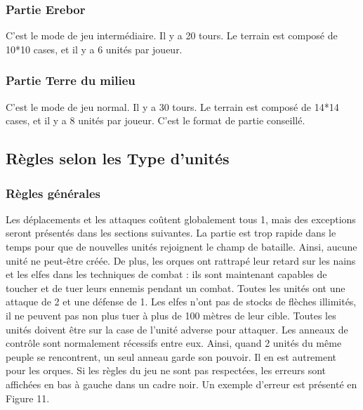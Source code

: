 \subsubsection{Partie Erebor}
C'est le mode de jeu intermédiaire. Il y a 20 tours. Le terrain est composé de 10*10 cases, et il y a 6 unités par joueur.
\subsubsection{Partie Terre du milieu}
C'est le mode de jeu normal. Il y a 30 tours. Le terrain est composé de 14*14 cases, et il y a 8 unités par joueur. C'est le format de partie conseillé.

\subsection{Règles selon les Type d'unités}
\subsubsection{Règles générales}
Les déplacements et les attaques coûtent globalement tous 1, mais des exceptions seront présentés dans les sections suivantes.
\newline
\newline
La partie est trop rapide dans le temps pour que de nouvelles unités rejoignent le champ de bataille. Ainsi, aucune unité ne peut-être créée.
\newline
 De plus, les orques ont rattrapé leur retard sur les nains et les elfes dans les techniques de combat : ils sont maintenant capables de toucher et de tuer leurs ennemis pendant un combat.
\newline
\newline
Toutes les unités ont une attaque de 2 et une défense de 1.
\newline
Les elfes n'ont pas de stocks de flèches illimités, il ne peuvent pas non plus tuer à plus de 100 mètres de leur cible. Toutes les unités doivent être sur la case de l'unité adverse pour attaquer.
\newline
Les anneaux de contrôle sont normalement récessifs entre eux. Ainsi, quand 2 unités du même peuple se rencontrent, un seul anneau garde son pouvoir. Il en est autrement pour les orques.
\newline
\newline
Si les règles du jeu ne sont pas respectées, les erreurs sont affichées en bas à gauche dans un cadre noir. Un exemple d'erreur est présenté en Figure 11.

